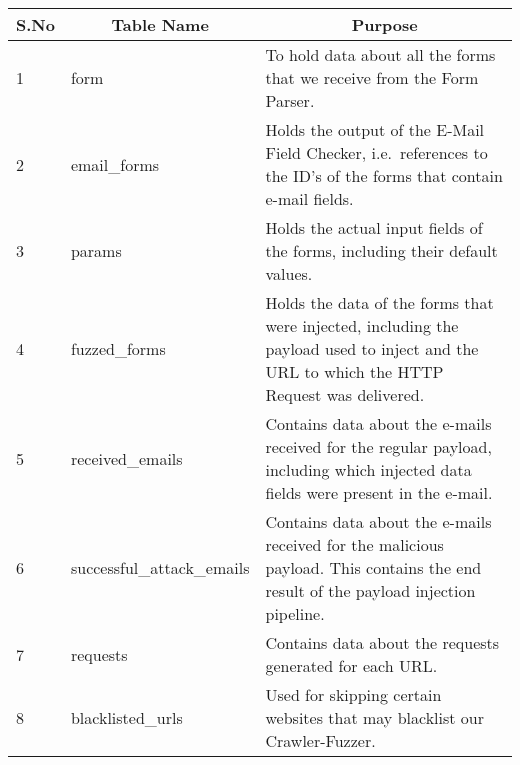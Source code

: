 \begin{tabular}{|p{1cm}|p{5cm}|p{8cm}|}
	\hline
	\multicolumn{1}{|c|}{\textbf{S.No}} & \multicolumn{1}{c}{\textbf{Table Name}} & 
	\multicolumn{1}{|c|}{\textbf{Purpose}}\\
	\hline
	1 & form & To hold data about all the forms that we receive from the Form Parser.\\
	\hline
	2 & {{email\_forms}} & Holds the output of the E-Mail Field Checker, i.e.\ references to the ID's of the forms that contain e-mail fields. \\
	\hline
	3 & params & Holds the actual input fields of the forms, including their default values.\\
	\hline
	4 & {{fuzzed\_forms}} & Holds the data of the forms that were injected, including the payload used to inject and the URL to which the HTTP Request was delivered.\\
	\hline
	5 & {{received\_emails}} & Contains data about the e-mails received for the regular payload, including which injected data fields were present in the e-mail.\\
	\hline
	6 & {{successful\_attack\_emails}} & Contains data about the e-mails received for the malicious payload. This contains the end result of the payload injection pipeline.\\
	\hline
	7 & requests & Contains data about the requests generated for each URL.\\
	\hline
	8 & {{blacklisted\_urls}} & Used for skipping certain websites that may blacklist our Crawler-Fuzzer.\\
	\hline
\end{tabular}